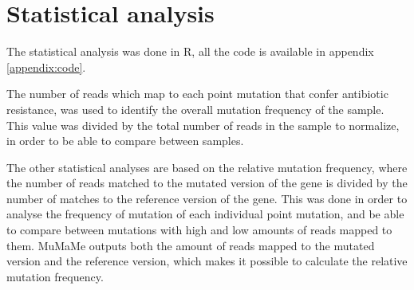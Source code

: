 % 


\section{Statistical analysis}
The statistical analysis was done in R, all the code is available in appendix \ref{appendix:code}.

The number of reads which map to each point mutation that confer antibiotic resistance, was used to identify the overall mutation frequency of the sample. This value was divided by the total number of reads in the sample to normalize, in order to be able to compare between samples.

The other statistical analyses are based on the relative mutation frequency, where the number of reads matched to the mutated version of the gene is divided by the number of matches to the reference version of the gene.
This was done in order to analyse the frequency of mutation of each individual point mutation, and be able to compare between mutations with high and low amounts of reads mapped to them.
MuMaMe outputs both the amount of reads mapped to the mutated version and the reference version, which makes it possible to calculate the relative mutation frequency. 

